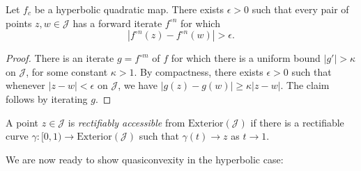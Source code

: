 

\begin{corollary} \label{elevator for points on julia}
	Let $f_c$ be a hyperbolic quadratic map.
	There exists  $\epsilon > 0$ such that 
	every pair of points $z,w\in\mathcal{J}$
	 has a forward iterate $f^{\circ n}$ for which 
	 \begin{equation*}
		\left|f^{\circ n}(z)-f^{\circ n}(w)\right|>\epsilon.	
	 \end{equation*}
\end{corollary}

\begin{proof}
	There is an iterate $g = f^{\circ m}$ of $f$ for which there is a uniform bound
	$|g'| > \kappa$ on $\mathcal J$, for some constant $\kappa  > 1$. 
	By compactness, there exists $\epsilon>0$ such that whenever $|z-w| < \epsilon$ on $\mathcal J$,
	we have $|g(z)-g(w)| \geq \kappa |z-w|$. The claim follows by iterating $g$.
\end{proof}

\begin{definition}
	A point $z \in \mathcal J$ is \emph{rectifiably accessible} from $\mathrm{Exterior}(\mathcal J)$ if there is a rectifiable curve $\gamma: [0,1) \to \mathrm{Exterior}(\mathcal J)$ such that $\gamma (t) \to z$ as $t \to 1$.
\end{definition}

We are now ready to show quasiconvexity in the hyperbolic case:

